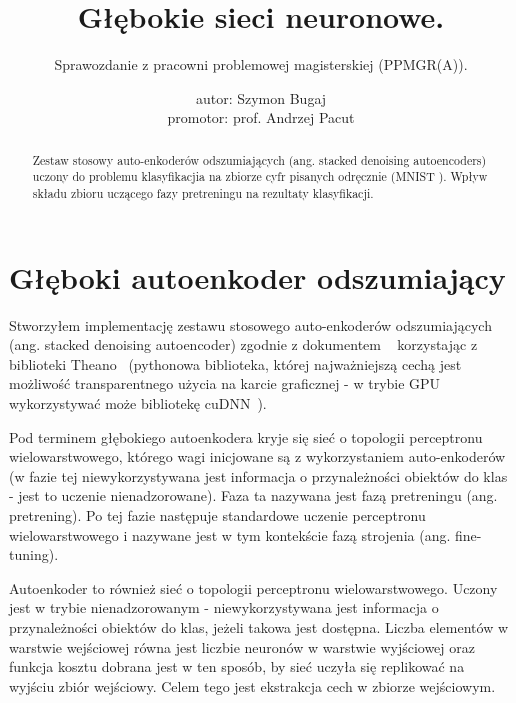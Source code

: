 \documentclass[fleqn]{scrartcl}
\begin{document}
\title{Głębokie sieci neuronowe.}
\subtitle{Sprawozdanie z pracowni problemowej magisterskiej (PPMGR(A)).}
\author{autor: Szymon Bugaj \\promotor: prof. Andrzej Pacut}

\maketitle

\begin{abstract}
Zestaw stosowy auto-enkoderów odszumiających (ang. stacked denoising autoencoders) uczony do problemu klasyfikacjia na zbiorze cyfr pisanych odręcznie (MNIST \cite{cite:MNIST}). Wpływ składu zbioru uczącego fazy pretreningu na rezultaty klasyfikacji.    
\end{abstract}

\tableofcontents






\section{Głęboki autoenkoder odszumiający}
Stworzyłem implementację zestawu stosowego auto-enkoderów odszumiających (ang. stacked denoising autoencoder) zgodnie z dokumentem ~\cite{cite:sda} korzystając z biblioteki Theano~\cite{cite:Theano} (pythonowa biblioteka, której najważniejszą cechą jest możliwość transparentnego użycia na karcie graficznej - w trybie GPU wykorzystywać może bibliotekę cuDNN~\cite{cite:cuDNN}).

Pod terminem głębokiego autoenkodera kryje się sieć o topologii perceptronu wielowarstwowego, którego wagi inicjowane są z wykorzystaniem auto-enkoderów (w fazie tej niewykorzystywana jest informacja o przynależności obiektów do klas - jest to uczenie nienadzorowane). Faza ta nazywana jest fazą pretreningu (ang. pretrening). Po tej fazie następuje standardowe uczenie perceptronu wielowarstwowego i nazywane jest w tym kontekście fazą strojenia (ang. fine-tuning).

Autoenkoder to również sieć o topologii perceptronu wielowarstwowego. Uczony jest w trybie nienadzorowanym - niewykorzystywana jest informacja o przynależności obiektów do klas, jeżeli takowa jest dostępna. Liczba elementów w warstwie wejściowej równa jest liczbie neuronów w warstwie wyjściowej oraz funkcja kosztu dobrana jest w ten sposób, by sieć uczyła się replikować na wyjściu zbiór wejściowy. Celem tego jest ekstrakcja cech w zbiorze wejściowym.
\end{document}
